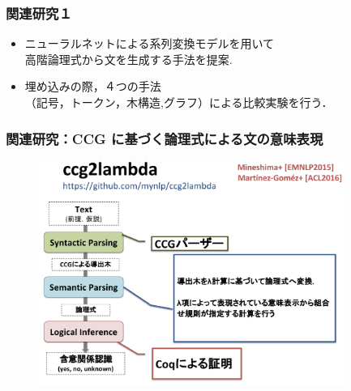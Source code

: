 \documentclass[dvipdfmx,cjk]{beamer}
\begin{document}
\begin{frame}
\frametitle{関連研究１}
\begin{center}
\end{center}
\begin{block}{}
  \begin{itemize}
    \item ニューラルネットによる系列変換モデルを用いて\\{\color{berry}高階論理式}から文を生成する手法を提案.
    \item 埋め込みの際，４つの手法\\（記号，トークン，木構造,グラフ）による比較実験を行う．
  \end{itemize}
\end{block}

\end{frame}


\begin{frame}
\frametitle{関連研究：CCG に基づく論理式による文の意味表現}
\begin{center}
\begin{figure}[h]
	\includegraphics[width=10cm]{c2l.png}
        \label{fig:c2l}
\end{figure}
\end{center}

\end{frame}



\end{document}
